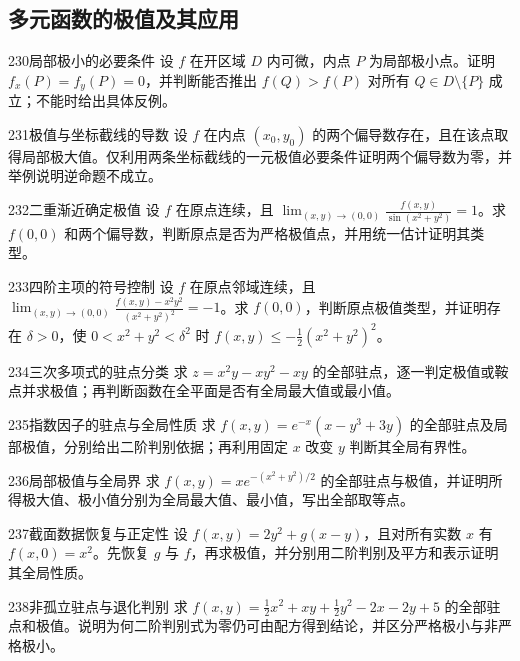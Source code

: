 \subsection{多元函数的极值及其应用}
\begin{exercise}{230}{局部极小的必要条件}
设 $f$ 在开区域 $D$ 内可微，内点 $P$ 为局部极小点。证明 $f_x(P)=f_y(P)=0$，并判断能否推出 $f(Q)>f(P)$ 对所有 $Q\in D\setminus\{P\}$ 成立；不能时给出具体反例。
\end{exercise}
\begin{exercise}{231}{极值与坐标截线的导数}
设 $f$ 在内点 $(x_0,y_0)$ 的两个偏导数存在，且在该点取得局部极大值。仅利用两条坐标截线的一元极值必要条件证明两个偏导数为零，并举例说明逆命题不成立。
\end{exercise}
\begin{exercise}{232}{二重渐近确定极值}
设 $f$ 在原点连续，且 $\lim_{(x,y)\to(0,0)}\frac{f(x,y)}{\sin(x^2+y^2)}=1$。求 $f(0,0)$ 和两个偏导数，判断原点是否为严格极值点，并用统一估计证明其类型。
\end{exercise}
\begin{exercise}{233}{四阶主项的符号控制}
设 $f$ 在原点邻域连续，且 $\lim_{(x,y)\to(0,0)}\frac{f(x,y)-x^2y^2}{(x^2+y^2)^2}=-1$。求 $f(0,0)$，判断原点极值类型，并证明存在 $\delta>0$，使 $0<x^2+y^2<\delta^2$ 时 $f(x,y)\le-\frac12(x^2+y^2)^2$。
\end{exercise}
\begin{exercise}{234}{三次多项式的驻点分类}
求 $z=x^2y-xy^2-xy$ 的全部驻点，逐一判定极值或鞍点并求极值；再判断函数在全平面是否有全局最大值或最小值。
\end{exercise}
\begin{exercise}{235}{指数因子的驻点与全局性质}
求 $f(x,y)=e^{-x}(x-y^3+3y)$ 的全部驻点及局部极值，分别给出二阶判别依据；再利用固定 $x$ 改变 $y$ 判断其全局有界性。
\end{exercise}
\begin{exercise}{236}{局部极值与全局界}
求 $f(x,y)=xe^{-(x^2+y^2)/2}$ 的全部驻点与极值，并证明所得极大值、极小值分别为全局最大值、最小值，写出全部取等点。
\end{exercise}
\begin{exercise}{237}{截面数据恢复与正定性}
设 $f(x,y)=2y^2+g(x-y)$，且对所有实数 $x$ 有 $f(x,0)=x^2$。先恢复 $g$ 与 $f$，再求极值，并分别用二阶判别及平方和表示证明其全局性质。
\end{exercise}
\begin{exercise}{238}{非孤立驻点与退化判别}
求 $f(x,y)=\frac12x^2+xy+\frac12y^2-2x-2y+5$ 的全部驻点和极值。说明为何二阶判别式为零仍可由配方得到结论，并区分严格极小与非严格极小。
\end{exercise}
